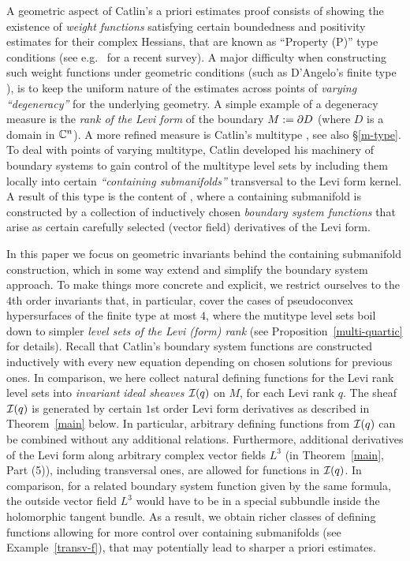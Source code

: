 \documentclass[12pt]{amsart}
\begin{document}
A geometric aspect of Catlin's a priori estimates proof
consists of showing the existence of {\em weight functions}
 satisfying certain boundedness and positivity estimates for their complex Hessians,
 that are known as ``Property (P)'' type conditions 
 (see e.g.\ \cite{BS16} for a recent survey).
A major difficulty when constructing such weight functions
under geometric conditions (such as D'Angelo's finite type \cite{D82}), 
is to keep the uniform 
nature of the estimates across points 
of {\em varying ``degeneracy''}
for the underlying geometry.
A simple example of a degeneracy measure
is the {\em rank of the Levi form} of the 
boundary $M:=\partial D$ (where $D$ is a domain in ${{\mathbb{C}}^n}$).
A more refined measure
is Catlin's multitype \cite{C84b}, see also \S\ref{m-type}.
To deal with points of varying multitype, 
Catlin developed his machinery of boundary systems \cite{C84b}
to gain control of the multitype level sets
by including them locally into certain {\em ``containing submanifolds''}
transversal to the Levi form kernel.
A result of this type is the content of 
\cite[Main Theorem, Part (2)]{C84b},
where a containing submanifold
is constructed by a collection of 
inductively chosen {\em boundary system functions}
that arise as certain carefully selected
(vector field) derivatives of the Levi form.

In this paper we focus on geometric invariants
behind the containing submanifold construction,
which in some way extend and simplify the boundary system approach.
To make things more concrete and explicit,
we restrict ourselves to the
$4$th order invariants that, in particular,
cover the cases of pseudoconvex hypersurfaces of the finite type
at most $4$,
where the mutitype level sets
boil down to simpler {\em level sets of the
Levi (form) rank} (see Proposition~\ref{multi-quartic} for details).
Recall that Catlin's boundary system functions
\cite{C84b}
are constructed inductively with every new equation
depending on chosen solutions for previous ones.
In comparison, we here collect natural defining functions 
for the Levi rank level sets
into {\em invariant ideal sheaves ${\mathcal{I}}(q)$} on $M$,
for each Levi rank $q$.
The sheaf ${\mathcal{I}}(q)$ is generated
by certain $1$st order Levi form derivatives as
described in Theorem~\ref{main} below.
In particular, arbitrary defining functions from ${\mathcal{I}}(q)$
can be combined without any additional relations.
Furthermore, additional derivatives
of the Levi form along arbitrary complex vector fields $L^3$
(in Theorem~\ref{main}, Part (5)),
including transversal ones,
 are allowed for functions in ${\mathcal{I}}(q)$.
In comparison, for a related boundary system function
given by the same formula,
the outside vector field $L^3$
would have to be in a special subbundle
inside the holomorphic tangent bundle.
As a result, we obtain richer classes of defining functions
allowing for more control over containing submanifolds
(see Example~\ref{transv-f}),
that may potentially lead to sharper a priori estimates.
\end{document}
